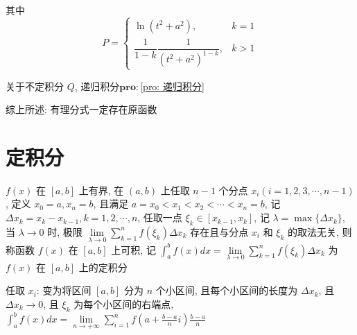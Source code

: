 \begin{theorem}
	其中 
	$$P = \begin{cases} 
		\ln(t^{2}+a^{2}), &k=1 \\ 
		\dfrac{1}{1-k}\dfrac{1}{(t^{2}+a^{2})^{1-k}}, &k > 1  
	\end{cases}$$

	关于不定积分 $Q$, 递归积分$\mathbf{pro:}$\ref{pro: 递归积分}

	综上所述: 有理分式一定存在原函数
\end{theorem}
\section{定积分}
\begin{definition}[定积分]
	$f(x)$ 在 $[a,b]$ 上有界, 在 $(a,b)$ 上任取 $n-1$ 个分点 $x_{i}(i = 1,2,3,\cdots,n-1)$, 定义 $x_{0} = a, x_{n} = b$, 且满足 $a = x_{0} < x_{1}<x_{2}<\cdots<x_{n} = b$, 记 $\Delta x_{k}=x_{k}-x_{k-1},k=1,2,\cdots,n$, 任取一点 $\xi_{k}\in[x_{k-1},x_{k}]$, 
	记 $\lambda = \max\{\Delta x_{k}\}$, 当 $\lambda\to 0$ 时, 极限 $\lim\limits_{\lambda\to 0}\sum\limits_{k=1}^{n}f(\xi_{k})\Delta x_{k}$ 存在且与分点 $x_{i}$ 和 $\xi_{k}$ 的取法无关, 
	则称函数 $f(x)$ 在 $[a,b]$ 上可积, 记 $\int_{a}^{b}f(x)dx = \lim\limits_{\lambda\to 0}\sum\limits_{k=1}^{n}f(\xi_{k})\Delta x_{k}$ 为 $f(x)$ 在 $[a,b]$ 上的定积分

	任取 $x_{i}$: 变为将区间 $[a,b]$ 分为 $n$ 个小区间, 且每个小区间的长度为 $\Delta x_{k}$, 且 $\Delta x_{k}\to 0$, 且 $\xi_{k}$ 为每个小区间的右端点, $\int_{a}^{b}f(x)dx = \lim\limits_{n\to +\infty}\sum\limits_{i=1}^{n}f(a+\frac{b-a}{n}i)\frac{b-a}{n}$
\end{definition}


